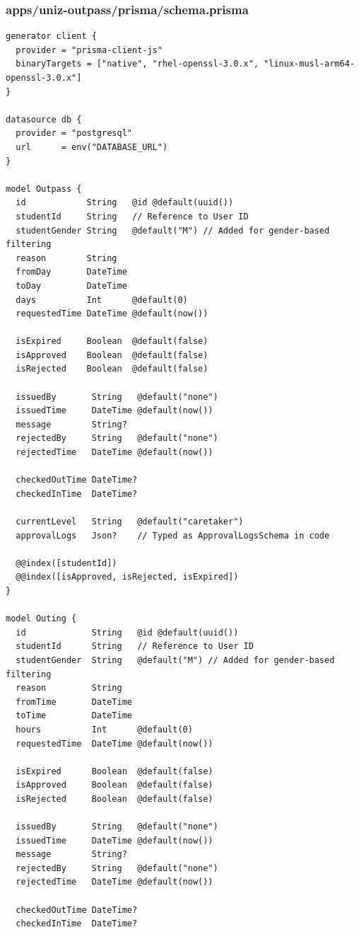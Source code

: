 \documentclass[11pt,a4paper,oneside]{article}
\begin{document}
\subsubsection*{apps/uniz-outpass/prisma/schema.prisma}
\begin{lstlisting}
generator client {
  provider = "prisma-client-js"
  binaryTargets = ["native", "rhel-openssl-3.0.x", "linux-musl-arm64-openssl-3.0.x"]
}

datasource db {
  provider = "postgresql"
  url      = env("DATABASE_URL")
}

model Outpass {
  id            String   @id @default(uuid())
  studentId     String   // Reference to User ID
  studentGender String   @default("M") // Added for gender-based filtering
  reason        String
  fromDay       DateTime
  toDay         DateTime
  days          Int      @default(0)
  requestedTime DateTime @default(now())
  
  isExpired     Boolean  @default(false)
  isApproved    Boolean  @default(false)
  isRejected    Boolean  @default(false)
  
  issuedBy       String   @default("none")
  issuedTime     DateTime @default(now())
  message        String?
  rejectedBy     String   @default("none")
  rejectedTime   DateTime @default(now())
  
  checkedOutTime DateTime?
  checkedInTime  DateTime?
  
  currentLevel   String   @default("caretaker")
  approvalLogs   Json?    // Typed as ApprovalLogsSchema in code

  @@index([studentId])
  @@index([isApproved, isRejected, isExpired])
}

model Outing {
  id             String   @id @default(uuid())
  studentId      String   // Reference to User ID
  studentGender  String   @default("M") // Added for gender-based filtering
  reason         String
  fromTime       DateTime
  toTime         DateTime
  hours          Int      @default(0)
  requestedTime  DateTime @default(now())
  
  isExpired      Boolean  @default(false)
  isApproved     Boolean  @default(false)
  isRejected     Boolean  @default(false)
  
  issuedBy       String   @default("none")
  issuedTime     DateTime @default(now())
  message        String?
  rejectedBy     String   @default("none")
  rejectedTime   DateTime @default(now())
  
  checkedOutTime DateTime?
  checkedInTime  DateTime?
  

\end{lstlisting}
\end{document}
